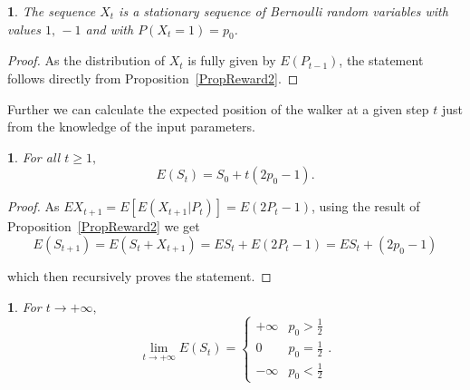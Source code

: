 \documentclass{amsart}
\theoremstyle{definition}
\theoremstyle{plain}
\newtheorem{prop}[thm]{\protect\propositionname}
\theoremstyle{plain}
\newtheorem{cor}[thm]{\protect\corollaryname}
\theoremstyle{plain}
\numberwithin{equation}{section}
\providecommand{\corollaryname}{Corollary}
\providecommand{\propositionname}{Proposition}
\begin{document}
    \begin{prop}
        The sequence $X_t$ is a stationary sequence of Bernoulli random
        variables with values $1,\,-1$ and with $P(X_t=1)=p_0$.
    \end{prop}
    \begin{proof}
        As the distribution of $X_t$ is fully given by $E(P_{t-1})$, the
        statement follows directly from Proposition~\ref{PropReward2}.
    \end{proof}

    Further we can calculate the expected position of the walker at a given step $t$ just from the knowledge of the input parameters.

    \begin{prop}
        For all $t\geq1,$
        \[
            E(S_{t})=S_{0}+t(2p_{0}-1).
        \]
    \end{prop}
    \begin{proof}
    As $EX_{t+1}=E[E(X_{t+1}|P_t)]=E(2P_t -1)$, using the result of Proposition~\ref{PropReward2} we get
        \[
            E(S_{t+1})= {E(S_{t}+X_{t+1}) = ES_{t}+E(2P_{t}-1)}=
            ES_{t}+(2p_{0}-1)
        \]

        which then recursively proves the statement.
    \end{proof}

    \begin{cor}
        For $t\rightarrow+\infty,$ \textup{
            \[
                \lim_{t\to+\infty}E(S_{t})=\begin{cases}
                                               +\infty & p_{0}>\frac{1}{2}\\
                                               0 & p_{0}=\frac{1}{2}\\
                                               -\infty & p_{0}<\frac{1}{2}
                \end{cases}.
            \]
        }
    \end{cor}
\end{document}
